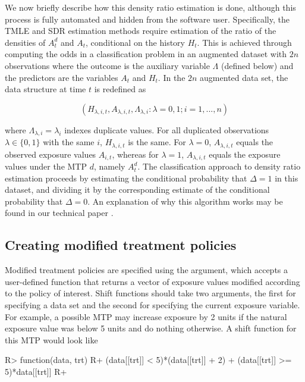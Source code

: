 \documentclass[]{jss}
\begin{document}
We now briefly describe how this density ratio estimation is done,
although this process is fully automated and hidden from the software
user. Specifically, the TMLE and SDR estimation methods require
estimation of the ratio of the densities of $A_t^d$ and $A_t$,
conditional on the history $H_t$. This is achieved through computing
the odds in a classification problem in an augmented dataset with $2n$
observations where the outcome is the auxiliary variable $\Lambda$
(defined below) and the predictors are the variables $A_t$ and
$H_t$. In the $2n$ augmented data set, the data structure at time
\(t\) is redefined as

\begin{equation}
(H_{\lambda, i, t}, A_{\lambda, i, t}, \Lambda_{\lambda, i} : \lambda = 0, 1; i = 1, ..., n)
\end{equation}

where \(\Lambda_{\lambda, i} = \lambda_i\) indexes duplicate values.
For all duplicated observations $\lambda\in\{0,1\}$ with the same $i$,
\(H_{\lambda, i, t}\) is the same. For $\lambda = 0$,
$A_{\lambda, i, t}$ equals the observed exposure values $A_{i, t}$,
whereas for $\lambda=1$, $A_{\lambda, i, t}$ equals the exposure
values under the MTP \(d\), namely \(A^{d}_t\). The classification
approach to density ratio estimation proceeds by estimating the conditional
probability that $\Delta=1$ in this dataset, and dividing it by the
corresponding estimate of the conditional probability that
$\Delta=0$. An explanation of why this algorithm works may be found in
our technical paper  \citep{diazNonparametricCausalEffects2020a}.

\hypertarget{creating-modified-treatment-policies}{%
\subsection{Creating modified treatment
policies}\label{creating-modified-treatment-policies}}

Modified treatment policies are specified using the  argument, which
accepts a user-defined function that returns a vector of exposure values
modified according to the policy of interest. Shift functions should take two
arguments, the first for specifying a data set and the second for
specifying the current exposure variable. For example, a possible MTP
may increase exposure by 2 units if the natural exposure value was below
5 units and do nothing otherwise. A shift function for this MTP would
look like

\begin{CodeChunk}

\begin{CodeInput}
R> function(data, trt) {
R+  (data[[trt]] < 5)*(data[[trt]] + 2) + (data[[trt]] >= 5)*data[[trt]]
R+ }
\end{CodeInput}

\end{CodeChunk}
\end{document}
